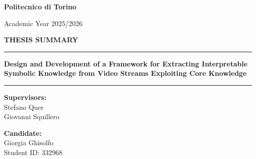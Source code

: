 \documentclass[12pt,a4paper]{report}
\begin{document}

\begin{titlepage}
    \centering
    \vspace*{1.5cm}

    {\Large \textbf{Politecnico di Torino} \par}
    \vspace{0.3cm}
    {\large Academic Year 2025/2026 \par}

    \vspace{2.5cm}

    {\LARGE \textbf{THESIS SUMMARY} \par}
    \vspace{1cm}

    \rule{0.8\textwidth}{0.5pt}
    \vspace{0.8cm}

    {\large \textbf{Design and Development of a Framework for Extracting Interpretable Symbolic Knowledge from Video Streams Exploiting Core Knowledge} \par}

    \vspace{0.8cm}
    \rule{0.8\textwidth}{0.5pt}

    \vfill

    \begin{minipage}[t]{0.45\textwidth}
        \textbf{Supervisors:} \\
        Stefano Quer \\
        Giovanni Squillero
    \end{minipage}
    \hfill
    \begin{minipage}[t]{0.45\textwidth}
        \raggedleft
        \textbf{Candidate:} \\
        Giorgia Ghisolfo \\
        Student ID: 332968
    \end{minipage}

    \vspace{1.5cm}

\end{titlepage}
\end{document}
